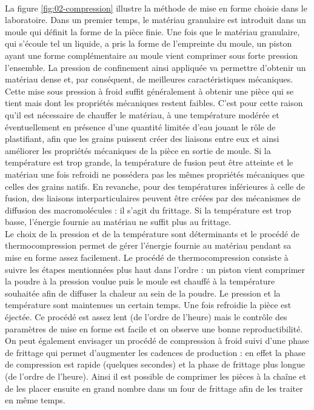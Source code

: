 \\La figure \ref{fig:02-compression} illustre la méthode de mise en forme choisie dans le laboratoire. Dans un premier temps, le matériau granulaire est introduit dans un moule qui définit la forme de la pièce finie. Une fois que le matériau granulaire, qui s'écoule tel un liquide, a pris la forme de l'empreinte du moule, un piston ayant une forme complémentaire au moule vient comprimer sous forte pression l'ensemble. La pression de confinement ainsi appliquée va permettre d'obtenir un matériau dense et, par conséquent, de meilleures caractéristiques mécaniques. Cette mise sous pression à froid suffit généralement à obtenir une pièce qui se tient mais dont les propriétés mécaniques restent faibles. C'est pour cette raison qu'il est nécessaire de chauffer le matériau, à une température modérée et éventuellement en présence d'une quantité limitée d'eau jouant le rôle de plastifiant, afin que les grains puissent créer des liaisons entre eux et ainsi améliorer les propriétés mécaniques de la pièce en sortie de moule. Si la température est trop grande, la température de fusion peut être atteinte et le matériau une fois refroidi ne possédera pas les mêmes propriétés mécaniques que celles des grains natifs. En revanche, pour des températures inférieures à celle de fusion, des liaisons interparticulaires peuvent être créées par des mécanismes de diffusion des macromolécules : il s'agit du frittage. Si la température est trop basse, l'énergie fournie au matériau ne suffit plus au frittage.
\\Le choix de la pression et de la température sont déterminants et le procédé de thermocompression permet de gérer l'énergie fournie au matériau pendant sa mise en forme assez facilement. Le procédé de thermocompression consiste à suivre les étapes mentionnées plus haut dans l'ordre : un piston vient comprimer la poudre à la pression voulue puis le moule est chauffé à la température souhaitée afin de diffuser la chaleur au sein de la poudre. Le pression et la température sont maintenues un certain temps. Une fois refroidie la pièce est éjectée. Ce procédé est assez lent (de l'ordre de l'heure) mais le contrôle des paramètres de mise en forme est facile et on observe une bonne reproductibilité. On peut également envisager un procédé de compression à froid suivi d'une phase de frittage qui permet d'augmenter les cadences de production : en effet la phase de compression est rapide (quelques secondes) et la phase de frittage plus longue (de l'ordre de l'heure). Ainsi il est possible de comprimer les pièces à la chaîne et de les placer ensuite en grand nombre dans un four de frittage afin de les traiter en même temps.

